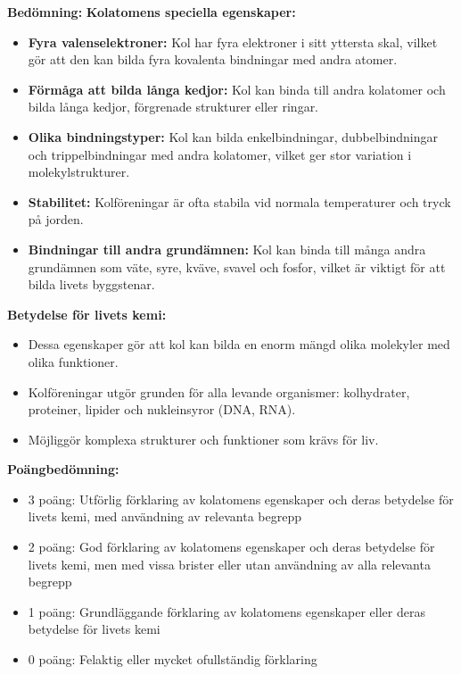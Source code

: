 \documentclass[12pt]{exam}
\newenvironment{answer}
  {\begin{framed}\color{blue}\textbf{Bedömning:} }
  {\end{framed}}
\begin{document}
\begin{questions}
\begin{answer}
\textbf{Kolatomens speciella egenskaper:}
\begin{itemize}
  \item \textbf{Fyra valenselektroner:} Kol har fyra elektroner i sitt yttersta skal, vilket gör att den kan bilda fyra kovalenta bindningar med andra atomer.
  
  \item \textbf{Förmåga att bilda långa kedjor:} Kol kan binda till andra kolatomer och bilda långa kedjor, förgrenade strukturer eller ringar.
  
  \item \textbf{Olika bindningstyper:} Kol kan bilda enkelbindningar, dubbelbindningar och trippelbindningar med andra kolatomer, vilket ger stor variation i molekylstrukturer.
  
  \item \textbf{Stabilitet:} Kolföreningar är ofta stabila vid normala temperaturer och tryck på jorden.
  
  \item \textbf{Bindningar till andra grundämnen:} Kol kan binda till många andra grundämnen som väte, syre, kväve, svavel och fosfor, vilket är viktigt för att bilda livets byggstenar.
\end{itemize}

\textbf{Betydelse för livets kemi:}
\begin{itemize}
  \item Dessa egenskaper gör att kol kan bilda en enorm mängd olika molekyler med olika funktioner.
  
  \item Kolföreningar utgör grunden för alla levande organismer: kolhydrater, proteiner, lipider och nukleinsyror (DNA, RNA).
  
  \item Möjliggör komplexa strukturer och funktioner som krävs för liv.
\end{itemize}

\textbf{Poängbedömning:}
\begin{itemize}
  \item 3 poäng: Utförlig förklaring av kolatomens egenskaper och deras betydelse för livets kemi, med användning av relevanta begrepp
  
  \item 2 poäng: God förklaring av kolatomens egenskaper och deras betydelse för livets kemi, men med vissa brister eller utan användning av alla relevanta begrepp
  
  \item 1 poäng: Grundläggande förklaring av kolatomens egenskaper eller deras betydelse för livets kemi
  
  \item 0 poäng: Felaktig eller mycket ofullständig förklaring
\end{itemize}
\end{answer}
\vspace{5mm}

\end{questions}
\end{document}
